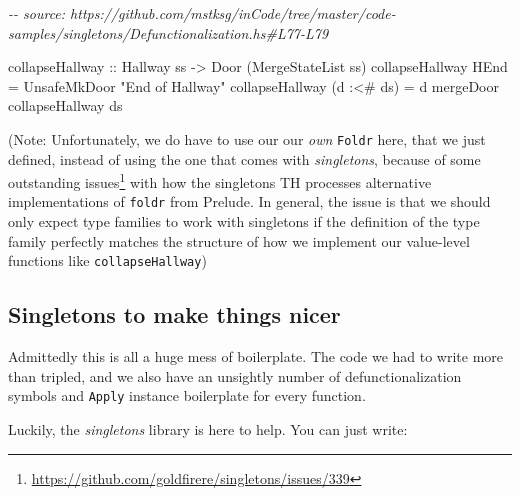 \documentclass[]{article}
\newenvironment{Shaded}{}{}
\newcommand{\CommentTok}[1]{\textcolor[rgb]{0.38,0.63,0.69}{\textit{#1}}}
\newcommand{\DataTypeTok}[1]{\textcolor[rgb]{0.56,0.13,0.00}{#1}}
\newcommand{\NormalTok}[1]{#1}
\newcommand{\OperatorTok}[1]{\textcolor[rgb]{0.40,0.40,0.40}{#1}}
\newcommand{\OtherTok}[1]{\textcolor[rgb]{0.00,0.44,0.13}{#1}}
\newcommand{\StringTok}[1]{\textcolor[rgb]{0.25,0.44,0.63}{#1}}
\renewcommand{\href}[2]{#2\footnote{\url{#1}}}
\begin{document}
\begin{Shaded}
\begin{Highlighting}[]
\CommentTok{{-}{-} source: https://github.com/mstksg/inCode/tree/master/code{-}samples/singletons/Defunctionalization.hs\#L77{-}L79}

\OtherTok{collapseHallway ::} \DataTypeTok{Hallway}\NormalTok{ ss }\OtherTok{{-}>} \DataTypeTok{Door}\NormalTok{ (}\DataTypeTok{MergeStateList}\NormalTok{ ss)}
\NormalTok{collapseHallway }\DataTypeTok{HEnd}       \OtherTok{=} \DataTypeTok{UnsafeMkDoor} \StringTok{"End of Hallway"}
\NormalTok{collapseHallway (d }\OperatorTok{:<\#}\NormalTok{ ds) }\OtherTok{=}\NormalTok{ d }\OtherTok{\textasciigrave{}mergeDoor\textasciigrave{}}\NormalTok{ collapseHallway ds}
\end{Highlighting}
\end{Shaded}

(Note: Unfortunately, we do have to use our our \emph{own} \texttt{Foldr} here,
that we just defined, instead of using the one that comes with
\emph{singletons}, because of some
\href{https://github.com/goldfirere/singletons/issues/339}{outstanding issues}
with how the singletons TH processes alternative implementations of
\texttt{foldr} from Prelude. In general, the issue is that we should only expect
type families to work with singletons if the definition of the type family
perfectly matches the structure of how we implement our value-level functions
like \texttt{collapseHallway})

\hypertarget{singletons-to-make-things-nicer}{%
\subsection{Singletons to make things
nicer}\label{singletons-to-make-things-nicer}}

Admittedly this is all a huge mess of boilerplate. The code we had to write more
than tripled, and we also have an unsightly number of defunctionalization
symbols and \texttt{Apply} instance boilerplate for every function.

Luckily, the \emph{singletons} library is here to help. You can just write:

\begin{Shaded}
\end{Shaded}
\end{document}
